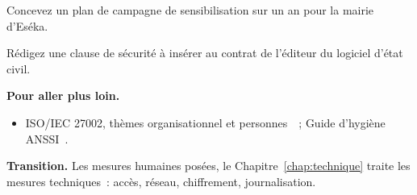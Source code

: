 \begin{boxexo}[title={\ding{45}\quad Exercice~15.9. Plan de campagne \niveauexpert}]
Concevez un plan de campagne de sensibilisation sur un an pour la mairie
d'Eséka.
\end{boxexo}

\begin{boxexo}[title={\ding{45}\quad Exercice~15.10. Clause fournisseur \niveauexpert}]
Rédigez une clause de sécurité à insérer au contrat de l'éditeur du logiciel
d'état civil.
\end{boxexo}

\bigskip

\begin{boxinfo}
\textbf{Pour aller plus loin.}
\begin{itemize}
    \item ISO/IEC 27002, thèmes organisationnel et personnes~\cite{iso27002}~;
          Guide d'hygiène ANSSI~\cite{anssihygiene2017}.
\end{itemize}
\end{boxinfo}

\begin{boxinfo}
\textbf{Transition.} Les mesures humaines posées, le Chapitre~\ref{chap:technique}
traite les mesures techniques~: accès, réseau, chiffrement, journalisation.
\end{boxinfo}
